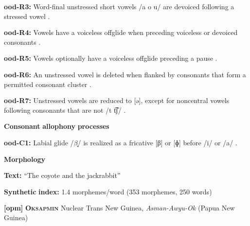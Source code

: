 \begin{styleBody}
\textbf{ood-R3:} Word-final unstressed short vowels /a o u/ are devoiced following a stressed vowel \citep[31]{Saxton1963}.
\end{styleBody}

\begin{styleBody}
\textbf{ood-R4:} Vowels have a voiceless offglide when preceding voiceless or devoiced consonants \citep[31]{Saxton1963}.
\end{styleBody}

\begin{styleBody}
\textbf{ood-R5:} Vowels optionally have a voiceless offglide preceding a pause \citep[31]{Saxton1963}.
\end{styleBody}

\begin{styleBody}
\textbf{ood-R6:} An unstressed vowel is deleted when flanked by consonants that form a permitted consonant cluster \citep[103]{Saxton1982}.
\end{styleBody}

\begin{styleBody}
\textbf{ood-R7:} Unstressed vowels are reduced to [ə], except for noncentral vowels following consonants that are not /t t͡ʃ/ \citep[104]{Saxton1982}.
\end{styleBody}

\begin{styleBody}
\textbf{Consonant} \textbf{allophony} \textbf{processes}
\end{styleBody}

\begin{styleBody}
\textbf{ood-C1:} Labial glide /$\beta ̞$/ is realized as a fricative [β] or [ɸ] before /i/ or /a/ \citep[31]{Saxton1963}.
\end{styleBody}

\begin{styleBody}
\textbf{Morphology}
\end{styleBody}

\begin{styleBody}
\textbf{Text:} “The coyote and the jackrabbit” \citep[263-266]{Saxton1982}
\end{styleBody}

\begin{styleBody}
\textbf{Synthetic} \textbf{index:} 1.4 morphemes/word (353 morphemes, 250 words)
\end{styleBody}

\begin{styleBody}
\textbf{[opm]}   \textbf{\textsc{Oksapmin}}  Nuclear Trans New Guinea, \textit{Asman-Awyu-Ok} (Papua New Guinea)
\end{styleBody}

